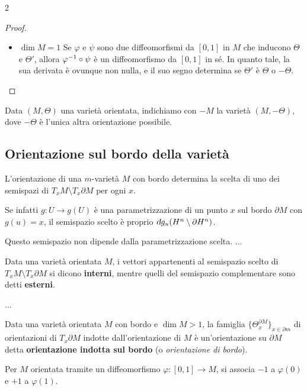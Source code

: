 \begin{multicols*}{2}
\begin{proof}
\begin{itemize}
            \item $\boxed{\dim M = 1}$ Se $\varphi$ e $\psi$ sono due diffeomorfismi da $[0, 1]$ in $M$ che inducono
                  $\Theta$ e $\Theta'$, allora $\varphi^{-1} \circ \psi$ è un diffeomorfismo da $[0, 1]$ in sé. In quanto
                  tale, la sua derivata è ovunque non nulla, e il suo segno determina se $\Theta'$ è $\Theta$ o $-\Theta$.
        \end{itemize}
    \end{proof}

    \begin{definition}
        Data $(M, \Theta)$ una varietà orientata, indichiamo con $-M$ la varietà
        $(M, -\Theta)$, dove $-\Theta$ è l'unica altra orientazione possibile.
    \end{definition}

    \subsection{Orientazione sul bordo della varietà}

    \begin{remark}
        L'orientazione di una $m$-varietà $M$ con bordo determina la scelta di uno dei semispazi di
        $T_x M \setminus T_x \partial M$ per ogni $x$. \smallskip

        Se infatti $g : U \to g(U)$ è una parametrizzazione di un punto $x$ sul bordo $\partial M$ con $g(u) = x$,
        il semispazio scelto è proprio $\dif g_u (H^n \setminus \partial H^n)$. \smallskip

        Questo semispazio non dipende dalla parametrizzazione scelta.
        ...
    \end{remark}

    \begin{definition}
        Data una varietà orientata $M$, i vettori appartenenti al semispazio
        scelto di $T_x M \setminus T_x \partial M$ si dicono \textbf{interni},
        mentre quelli del semispazio complementare sono detti \textbf{esterni}.
    \end{definition}

    \begin{lemma}
        ...
    \end{lemma}

    \begin{definition}
        Data una varietà orientata $M$ con bordo e $\dim M > 1$, la famiglia $\{ \Theta_x^{\partial M} \}_{x \in \partial m}$
        di orientazioni di $T_x \partial M$ indotte dall'orientazione di $M$ è un'orientazione su $\partial M$
        detta \textbf{orientazione indotta sul bordo} (o \textit{orientazione di bordo}). \smallskip

        Per $M$ orientata tramite un diffeomorfismo $\varphi : [0, 1] \to M$, si associa
        $-1$ a $\varphi(0)$ e $+1$ a $\varphi(1)$.
    \end{definition}
\end{multicols*}
